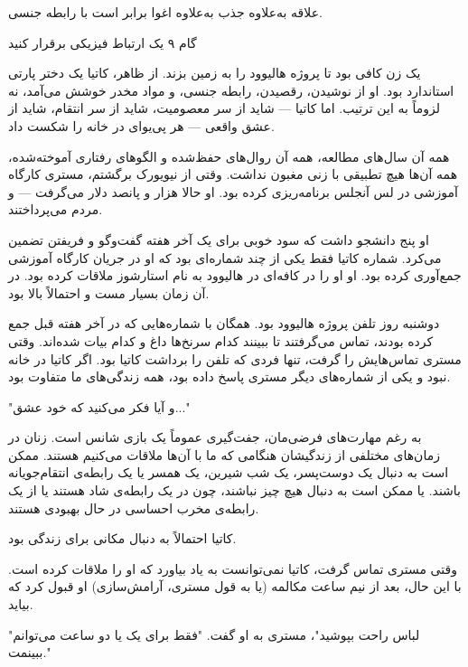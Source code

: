 علاقه به‌علاوه جذب به‌علاوه اغوا برابر است با رابطه جنسی.

گام ۹
یک ارتباط فیزیکی برقرار کنید

یک زن کافی بود تا پروژه هالیوود را به زمین بزند. از ظاهر، کاتیا یک دختر پارتی استاندارد بود. او از نوشیدن، رقصیدن، رابطه جنسی، و مواد مخدر خوشش می‌آمد، نه لزوماً به این ترتیب. اما کاتیا — شاید از سر معصومیت، شاید از سر انتقام، شاید از عشق واقعی — هر پی‌یو‌ای در خانه را شکست داد. 

همه آن سال‌های مطالعه، همه آن روال‌های حفظ‌شده و الگوهای رفتاری آموخته‌شده، همه آن‌ها هیچ تطبیقی با زنی مغبون نداشت. وقتی از نیویورک برگشتم، مستری کارگاه آموزشی در لس آنجلس برنامه‌ریزی کرده بود. او حالا هزار و پانصد دلار می‌گرفت — و مردم می‌پرداختند. 

او پنج دانشجو داشت که سود خوبی برای یک آخر هفته گفت‌وگو و فریفتن تضمین می‌کرد. شماره کاتیا فقط یکی از چند شماره‌ای بود که او در جریان کارگاه آموزشی جمع‌آوری کرده بود. او او را در کافه‌ای در هالیوود به نام استارشوز ملاقات کرده بود. در آن زمان بسیار مست و احتمالاً بالا بود.

دوشنبه روز تلفن پروژه هالیوود بود. همگان با شماره‌هایی که در آخر هفته قبل جمع کرده بودند، تماس می‌گرفتند تا ببینند کدام سرنخ‌ها داغ و کدام بیات شده‌اند. وقتی مستری تماس‌هایش را گرفت، تنها فردی که تلفن را برداشت کاتیا بود. اگر کاتیا در خانه نبود و یکی از شماره‌های دیگر مستری پاسخ داده بود، همه زندگی‌های ما متفاوت بود.

"و آیا فکر می‌کنید که خود عشق..."

به رغم مهارت‌های فرضی‌مان، جفت‌گیری عموماً یک بازی شانس است. زنان در زمان‌های مختلفی از زندگیشان هنگامی که ما با آن‌ها ملاقات می‌کنیم هستند. ممکن است به دنبال یک دوست‌پسر، یک شب شیرین، یک همسر یا یک رابطه‌ی انتقام‌جویانه باشند. یا ممکن است به دنبال هیچ چیز نباشند، چون در یک رابطه‌ی شاد هستند یا از یک رابطه‌ی مخرب احساسی در حال بهبودی هستند.

کاتیا احتمالاً به دنبال مکانی برای زندگی بود. 

وقتی مستری تماس گرفت، کاتیا نمی‌توانست به یاد بیاورد که او را ملاقات کرده است. با این حال، بعد از نیم ساعت مکالمه (یا به قول مستری، آرامش‌سازی) او قبول کرد که بیاید. 

"لباس راحت بپوشید"، مستری به او گفت. "فقط برای یک یا دو ساعت می‌توانم ببینمت."